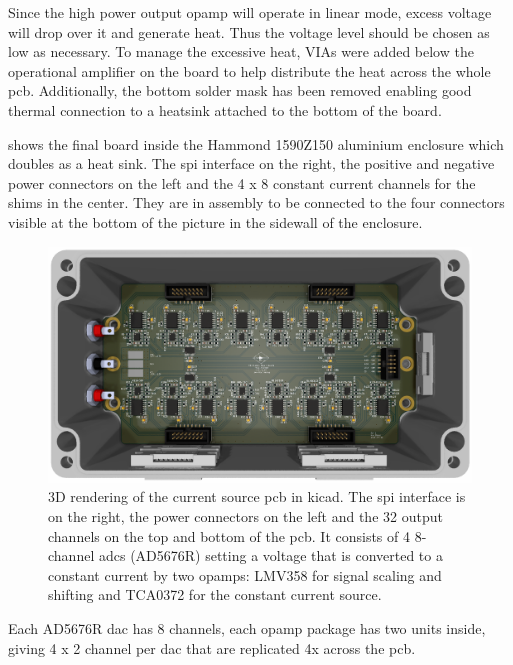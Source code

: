 Since the high power output \acrshort{opamp} will operate in linear mode, excess voltage will drop over it and generate heat. Thus the voltage level should be chosen as low as necessary. To manage the excessive heat, VIAs were added below the operational amplifier on the board to help distribute the heat across the whole \acrshort{pcb}. Additionally, the bottom solder mask has been removed enabling good thermal connection to a heatsink attached to the bottom of the board.

 shows the final board inside the Hammond 1590Z150 aluminium enclosure which doubles as a heat sink. The \acrshort{spi} interface on the right, the positive and negative power connectors on the left and the 4 x 8 constant current channels for the shims in the center. They are in assembly to be connected to the four connectors visible at the bottom of the picture in the sidewall of the enclosure.

\begin{figure}[hbt]
    \centering
    \includegraphics[width=\textwidth]{images/32-channel_current_source.png}
    \caption{ 3D rendering of the current source \acrshort{pcb} in \gls{kicad}. The \acrshort{spi} interface is on the right, the power connectors on the left and the 32 output channels on the top and bottom of the \acrshort{pcb}. It consists of 4 8-channel \acrshort{adc}s (AD5676R) setting a voltage that is converted to a constant current by two \acrshort{opamp}s: LMV358 for signal scaling and shifting and TCA0372 for the constant current source.}
\end{figure}

Each AD5676R \acrshort{dac} has 8 channels, each \acrshort{opamp} package has two units inside, giving 4 x 2 channel per \acrshort{dac} that are replicated 4x across the \acrshort{pcb}.

